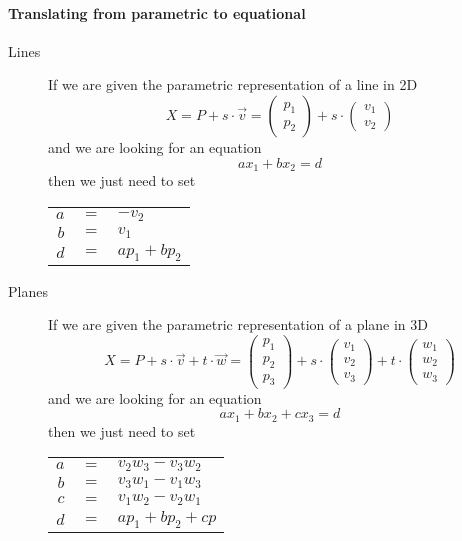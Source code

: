 \documentclass{article}
\begin{document}
\paragraph{Translating from parametric to equational}
\begin{description}
\item [Lines] If we are given the parametric representation of a line in 2D
$$X=P+s\cdot \vec{v}=\begin{pmatrix}p_1\\p_2\end{pmatrix}+s\cdot \begin{pmatrix}v_1\\v_2\end{pmatrix}$$
and we are looking for an equation
$$ax_1+bx_2=d$$
then we just need to set
\begin{center}
\begin{tabular}{r c l}
$a$ & $=$ & $-v_2$\\
$b$ & $=$ & $v_1$\\
$d$ & $=$ & $ap_1+bp_2$
\end{tabular}
\end{center}

\item [Planes] If we are given the parametric representation of a plane in 3D
$$X=P+s\cdot \vec{v}+t\cdot \vec{w}=\begin{pmatrix}p_1\\p_2\\p_3\end{pmatrix}+s\cdot \begin{pmatrix}v_1\\v_2\\v_3\end{pmatrix}+t\cdot \begin{pmatrix}w_1\\w_2\\w_3\end{pmatrix}$$
and we are looking for an equation
$$ax_1+bx_2+cx_3=d$$
then we just need to set
\begin{center}
\begin{tabular}{r c l}
$a$ & $=$ & $v_2w_3-v_3w_2$\\
$b$ & $=$ & $v_3w_1-v_1w_3$\\
$c$ & $=$ & $v_1w_2-v_2w_1$\\
$d$ & $=$ & $ap_1+bp_2+cp$
\end{tabular}
\end{center}
\end{description}
\end{document}
